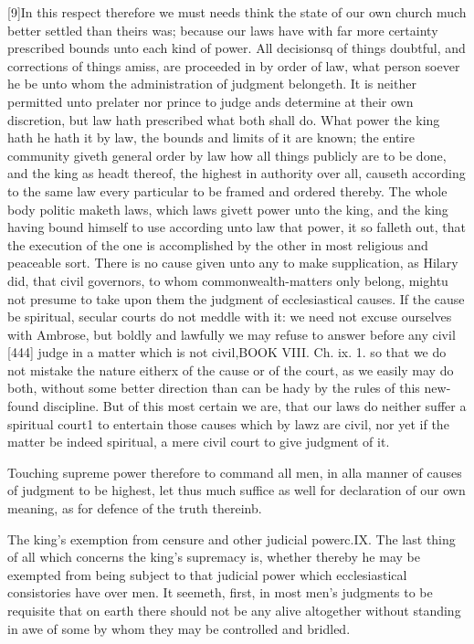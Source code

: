 [9]In this respect therefore we must needs think the state of our own church much better settled than theirs was; because our laws have with far more certainty prescribed bounds unto each kind of power. All decisionsq of things doubtful, and corrections of things amiss, are proceeded in by order of law, what person soever he be unto whom the administration of judgment belongeth. It is neither permitted unto prelater nor prince to judge ands determine at their own discretion, but law hath prescribed what both shall do. What power the king hath he hath it by law, the bounds and limits of it are known; the entire community giveth general order by law how all things publicly are to be done, and the king as headt thereof, the highest in authority over all, causeth according to the same law every particular to be framed and ordered thereby. The whole body politic maketh laws, which laws givett power unto the king, and the king having bound himself to use according unto law that power, it so falleth out, that the execution of the one is accomplished by the other in most religious and peaceable sort. There is no cause given unto any to make supplication, as Hilary did, that civil governors, to whom commonwealth-matters only belong, mightu not presume to take upon them the judgment of ecclesiastical causes. If the cause be spiritual, secular courts do not meddle with it: we need not excuse ourselves with Ambrose, but boldly and lawfully we may refuse to answer before any civil [444] judge in a matter which is not civil,BOOK VIII. Ch. ix. 1. so that we do not mistake the nature eitherx of the cause or of the court, as we easily may do both, without some better direction than can be hady by the rules of this new-found discipline. But of this most certain we are, that our laws do neither suffer a spiritual court1 to entertain those causes which by lawz are civil, nor yet if the matter be indeed spiritual, a mere civil court to give judgment of it.

Touching supreme power therefore to command all men, in alla manner of causes of judgment to be highest, let thus much suffice as well for declaration of our own meaning, as for defence of the truth thereinb.

The king’s exemption from censure and other judicial powerc.IX. The last thing of all which concerns the king’s supremacy is, whether thereby he may be exempted from being subject to that judicial power which ecclesiastical consistories have over men. It seemeth, first, in most men’s judgments to be requisite that on earth there should not be any alive altogether without standing in awe of some by whom they may be controlled and bridled.

